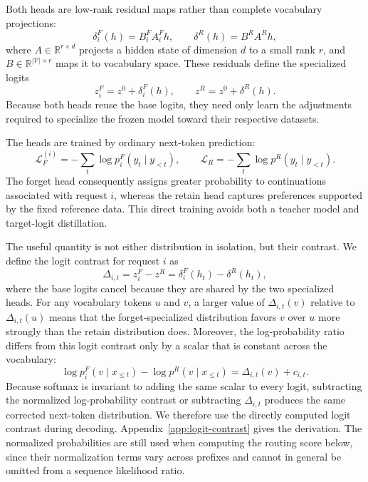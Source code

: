 \documentclass[11pt]{article}
\begin{document}
Both heads are low-rank residual maps rather than complete vocabulary projections:
\begin{equation}
    \delta_i^F(h)=B_i^F A_i^F h,
    \qquad
    \delta^R(h)=B^R A^R h,
\end{equation}
where $A\in\mathbb{R}^{r\times d}$ projects a hidden state of dimension $d$ to a small rank $r$, and $B\in\mathbb{R}^{|\mathcal{V}|\times r}$ maps it to vocabulary space. These residuals define the specialized logits
\begin{equation}
    z_i^F=z^0+\delta_i^F(h),
    \qquad
    z^R=z^0+\delta^R(h).
\end{equation}
Because both heads reuse the base logits, they need only learn the adjustments required to specialize the frozen model toward their respective datasets.

The heads are trained by ordinary next-token prediction:
\begin{equation}
    \mathcal{L}_F^{(i)}=-\sum_t \log p_i^F(y_t\mid y_{<t}),
    \qquad
    \mathcal{L}_R=-\sum_t \log p^R(y_t\mid y_{<t}).
\end{equation}
The forget head consequently assigns greater probability to continuations associated with request $i$, whereas the retain head captures preferences supported by the fixed reference data. This direct training avoids both a teacher model and target-logit distillation.

The useful quantity is not either distribution in isolation, but their contrast. We define the logit contrast for request $i$ as
\begin{equation}
    \Delta_{i,t}
    = z_i^F-z^R
    =\delta_i^F(h_t)-\delta^R(h_t),
\end{equation}
where the base logits cancel because they are shared by the two specialized heads. For any vocabulary tokens $u$ and $v$, a larger value of $\Delta_{i,t}(v)$ relative to $\Delta_{i,t}(u)$ means that the forget-specialized distribution favors $v$ over $u$ more strongly than the retain distribution does. Moreover, the log-probability ratio differs from this logit contrast only by a scalar that is constant across the vocabulary:
\begin{equation}
    \log p_i^F(v\mid x_{\leq t})
    -\log p^R(v\mid x_{\leq t})
    =\Delta_{i,t}(v)+c_{i,t}.
\end{equation}
Because softmax is invariant to adding the same scalar to every logit, subtracting the normalized log-probability contrast or subtracting $\Delta_{i,t}$ produces the same corrected next-token distribution. We therefore use the directly computed logit contrast during decoding. Appendix~\ref{app:logit-contrast} gives the derivation. The normalized probabilities are still used when computing the routing score below, since their normalization terms vary across prefixes and cannot in general be omitted from a sequence likelihood ratio.
\end{document}
